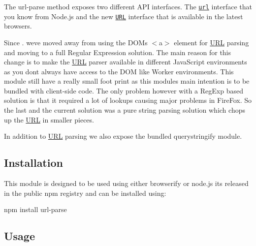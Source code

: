\href{http://unshift.io}{\tt }\href{http://browsenpm.org/package/url-parse}{\tt }\href{https://travis-ci.org/unshiftio/url-parse}{\tt }\href{https://david-dm.org/unshiftio/url-parse}{\tt }\href{https://coveralls.io/r/unshiftio/url-parse?branch=master}{\tt }\href{https://webchat.freenode.net/?channels=unshift}{\tt }

\href{https://saucelabs.com/u/url-parse}{\tt }

The {\ttfamily url-\/parse} method exposes two different A\+PI interfaces. The \href{https://nodejs.org/api/url.html}{\tt {\ttfamily url}} interface that you know from Node.\+js and the new \href{https://developer.mozilla.org/en-US/docs/Web/API/URL/URL}{\tt {\ttfamily U\+RL}} interface that is available in the latest browsers.

Since {.} we\textquotesingle{}ve moved away from using the D\+OM\textquotesingle{}s {\ttfamily $<$a$>$} element for \mbox{\hyperlink{namespace_u_r_l}{U\+RL}} parsing and moving to a full Regular Expression solution. The main reason for this change is to make the \mbox{\hyperlink{namespace_u_r_l}{U\+RL}} parser available in different Java\+Script environments as you don\textquotesingle{}t always have access to the D\+OM like {\ttfamily Worker} environments. This module still have a really small foot print as this module\textquotesingle{}s main intention is to be bundled with client-\/side code. The only problem however with a Reg\+Exp based solution is that it required a lot of lookups causing major problems in Fire\+Fox. So the last and the current solution was a pure string parsing solution which chops up the \mbox{\hyperlink{namespace_u_r_l}{U\+RL}} in smaller pieces.

In addition to \mbox{\hyperlink{namespace_u_r_l}{U\+RL}} parsing we also expose the bundled {\ttfamily querystringify} module.

\subsection*{Installation}

This module is designed to be used using either browserify or node.\+js it\textquotesingle{}s released in the public npm registry and can be installed using\+:


\begin{DoxyCode}
npm install url-parse
\end{DoxyCode}


\subsection*{Usage}


